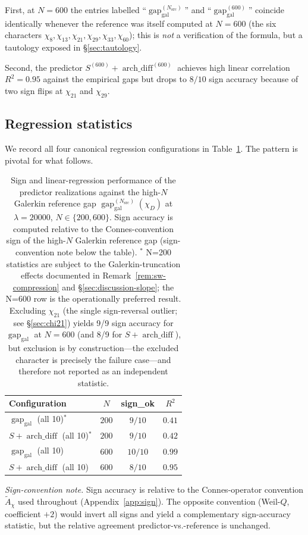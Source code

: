 \documentclass[a4paper,10pt,twocolumn]{article}
\theoremstyle{definition}
\theoremstyle{remark}
\newcommand{\gap}{\operatorname{gap}}
\newcommand{\chifn}{\chi}
\newcommand{\archdiff}{\operatorname{arch\_diff}}
\begin{document}
First, at $N=600$ the entries labelled
``$\gap_{\mathrm{gal}}^{(N_{\mathrm{src}})}$'' and
``$\gap_{\mathrm{gal}}^{(600)}$'' coincide identically whenever the
reference was itself computed at $N=600$ (the six characters
$\chifn_8,\chifn_{13},\chifn_{21},\chifn_{29},\chifn_{33},\chifn_{60}$);
this is \emph{not} a verification of the formula, but a tautology
exposed in \S\ref{sec:tautology}.

Second, the predictor $S^{(600)}+\archdiff^{(600)}$ achieves high
linear correlation $R^2=0.95$ against the empirical gaps but drops
to $8/10$ sign accuracy because of two sign flips at $\chifn_{21}$
and $\chifn_{29}$.

\subsection{Regression statistics}
\label{sec:validation-regression}

We record all four canonical regression configurations in
Table~\ref{tab:regression}. The pattern is pivotal for what follows.

\begin{table}[t]
\caption{Sign and linear-regression performance of the predictor
  realizations against the high-$N$ Galerkin reference gap
  $\gap_{\mathrm{gal}}^{(N_{\mathrm{src}})}(\chifn_D)$ at $\lambda=20000$,
  $N\in\{200,600\}$. Sign accuracy is computed relative to the
  Connes-convention sign of the high-$N$ Galerkin reference gap
  (sign-convention note below the table).
  $^*$ N=200 statistics are subject to the Galerkin-truncation
  effects documented in Remark~\ref{rem:sw-compression} and
  \S\ref{sec:discussion-slope}; the N=600 row is the operationally
  preferred result.
  Excluding $\chifn_{21}$ (the single sign-reversal outlier; see
  \S\ref{sec:chi21}) yields 9/9 sign accuracy for $\gap_{\mathrm{gal}}$
  at $N=600$ (and 8/9 for $S+\archdiff$), but exclusion is by
  construction---the excluded character is precisely the failure
  case---and therefore not reported as an independent statistic.}
\label{tab:regression}
\centering
\small
\begin{tabular}{@{}lccc@{}}
\toprule
Configuration & $N$ & sign\_ok & $R^2$ \\
\midrule
$\gap_{\mathrm{gal}}$ (all 10)$^*$ & $200$ & $9/10$ & $0.41$ \\
$S+\archdiff$ (all 10)$^*$ & $200$ & $9/10$ & $0.42$ \\
\midrule
$\gap_{\mathrm{gal}}$ (all 10) & $600$ & $10/10$ & $0.99$ \\
$S+\archdiff$ (all 10) & $600$ & $8/10$ & $0.95$ \\
\bottomrule
\end{tabular}

\smallskip
\footnotesize
\textit{Sign-convention note.} Sign accuracy is relative to the
Connes-operator convention $\tilde{A}_\chi$ used throughout
(Appendix~\ref{app:sign}). The opposite convention (Weil-$Q$,
coefficient $+2$) would invert all signs and yield a complementary
sign-accuracy statistic, but the relative agreement
predictor-vs.-reference is unchanged.
\end{table}
\end{document}
